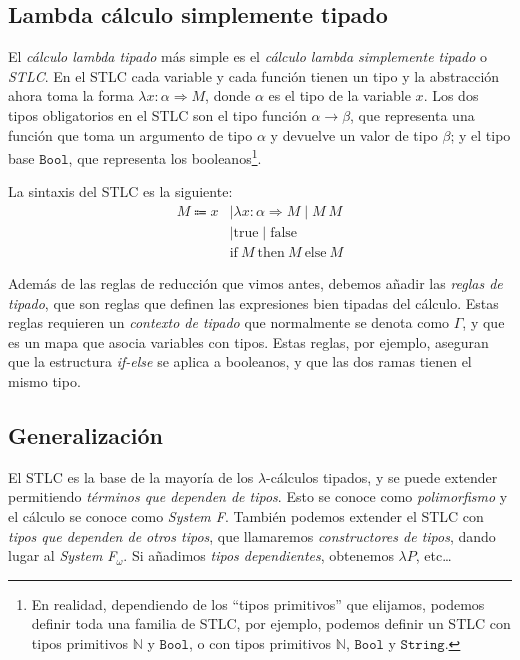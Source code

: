 \documentclass[
  a4paper, 
  10pt, 
  parskip=half, 
  toc=bibliography,
]{scrbook}
\theoremstyle{definition}
\theoremstyle{bolddef}
\renewcommand{\mapsto}{\Rightarrow}
\newcommand{\LeanIfElse}[3]{\text{if} \ {#1} \ \text{then} \ {#2} \ \text{else} \ {#3}}
\newcommand{\LeanTrue}{\text{true}}
\newcommand{\LeanFalse}{\text{false}}
\begin{document}
\subsection{Lambda cálculo simplemente tipado}

El \emph{cálculo lambda tipado} más simple es el \emph{cálculo lambda simplemente tipado} o
\emph{STLC}. En el STLC cada variable y cada función tienen un tipo y la
abstracción ahora toma la forma \(\lambda x: \alpha \mapsto M\), donde 
\(\alpha\) es el tipo de la variable \(x\). Los dos tipos obligatorios en el STLC
son el tipo función \(\alpha \to \beta\), que representa una función que
toma un argumento de tipo \(\alpha\) y devuelve un valor de tipo \(\beta\); y
el tipo base \(\texttt{Bool}\), que representa los booleanos\footnote{
  En realidad, dependiendo de los \enquote{tipos primitivos} que elijamos, podemos
  definir toda una familia de STLC, por ejemplo, podemos definir un STLC con
  tipos primitivos \(\mathbb{N}\) y \(\texttt{Bool}\), o con tipos primitivos
  \(\mathbb{N}\), \(\texttt{Bool}\) y \(\texttt{String}\).
}.

La sintaxis del STLC es la siguiente:
\begin{align*}
  M \Coloneqq x & \mid \lambda x: \alpha \mapsto M \mid M \ M \\
    & \mid \LeanTrue \mid \LeanFalse \\
    & \LeanIfElse{M}{M}{M}
\end{align*}

Además de las reglas de reducción que vimos antes, debemos añadir las
\emph{reglas de tipado}, que son reglas que definen las expresiones bien
tipadas del cálculo. Estas reglas requieren un \emph{contexto de tipado} que
normalmente se denota como \(\Gamma\), y que es un mapa que asocia variables con
tipos. Estas reglas, por ejemplo, aseguran que la estructura \emph{if-else} se aplica
a booleanos, y que las dos ramas tienen el mismo tipo.

\subsection{Generalización}

El STLC es la base de la mayoría de los \(\lambda\)-cálculos tipados, y se puede
extender permitiendo \emph{términos que dependen de tipos}. Esto se conoce como
\emph{polimorfismo} y el cálculo se conoce como \emph{System F}. También podemos
extender el STLC con \emph{tipos que dependen de otros tipos}, que llamaremos
\emph{constructores de tipos}, dando lugar al \emph{System F\(_\omega\)}.
Si añadimos \emph{tipos dependientes}, obtenemos \(\lambda P\), etc\ldots
\end{document}
